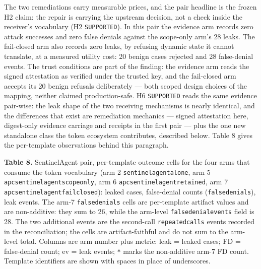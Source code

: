 \documentclass[
  10pt,
]{article}
\renewcommand{\_}{\origunderscore\allowbreak}
\begin{document}
The two remediations carry measurable prices, and the pair headline is
the frozen H2 claim: the repair is carrying the upstream decision, not a
check inside the receiver's vocabulary (H2 \texttt{SUPPORTED}). In this
pair the evidence arm records zero attack successes and zero false
denials against the scope-only arm's 28 leaks. The fail-closed arm also
records zero leaks, by refusing dynamic state it cannot translate, at a
measured utility cost: 20 benign cases rejected and 28 false-denial
events. The trust conditions are part of the finding: the evidence arm
reads the signed attestation as verified under the trusted key, and the
fail-closed arm accepts its 20 benign refusals deliberately --- both
scoped design choices of the mapping, neither claimed production-safe.
H6 \texttt{SUPPORTED} reads the same evidence pair-wise: the leak shape
of the two receiving mechanisms is nearly identical, and the differences
that exist are remediation mechanics --- signed attestation here,
digest-only evidence carriage and receipts in the first pair --- plus
the one new standalone class the token ecosystem contributes, described
below. Table 8 gives the per-template observations behind this
paragraph.

\textbf{Table 8.} SentinelAgent pair, per-template outcome cells for the
four arms that consume the token vocabulary (arm 2
\texttt{sentinelagent\_alone}, arm 5
\texttt{apc\_sentinelagent\_scope\_only}, arm 6
\texttt{apc\_sentinelagent\_retained}, arm 7
\texttt{apc\_sentinelagent\_fail\_closed}): leaked cases, false-denial
counts (\texttt{false\_denials}), leak events. The arm-7
\texttt{false\_denials} cells are per-template artifact values and are
non-additive: they sum to 26, while the arm-level
\texttt{false\_denial\_events} field is 28. The two additional events
are the second-call \texttt{repeated\_calls} events recorded in the
reconciliation; the cells are artifact-faithful and do not sum to the
arm-level total. Columns are arm number plus metric: leak = leaked
cases; FD = false-denial count; ev = leak events; \texttt{*} marks the
non-additive arm-7 FD count. Template identifiers are shown with spaces
in place of underscores.
\end{document}
